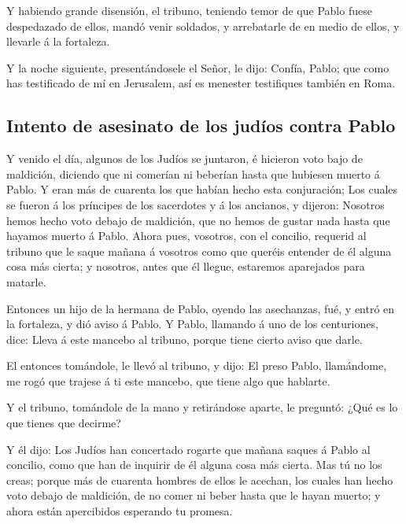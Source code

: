  Y habiendo grande disensión, el tribuno, teniendo temor
de que Pablo fuese despedazado de ellos, mandó venir soldados, y
arrebatarle de en medio de ellos, y llevarle á la fortaleza.

 Y la noche siguiente, presentándosele el Señor, le dijo:
Confía, Pablo; que como has testificado de mí en Jerusalem, así es
menester testifiques también en Roma.

\hypertarget{intento-de-asesinato-de-los-juduxedos-contra-pablo}{%
\subsection{Intento de asesinato de los judíos contra
Pablo}\label{intento-de-asesinato-de-los-juduxedos-contra-pablo}}

 Y venido el día, algunos de los Judíos se juntaron, é
hicieron voto bajo de maldición, diciendo que ni comerían ni beberían
hasta que hubiesen muerto á Pablo.  Y eran más de
cuarenta los que habían hecho esta conjuración;  Los
cuales se fueron á los príncipes de los sacerdotes y á los ancianos, y
dijeron: Nosotros hemos hecho voto debajo de maldición, que no hemos de
gustar nada hasta que hayamos muerto á Pablo.  Ahora
pues, vosotros, con el concilio, requerid al tribuno que le saque mañana
á vosotros como que queréis entender de él alguna cosa más cierta; y
nosotros, antes que él llegue, estaremos aparejados para matarle.

 Entonces un hijo de la hermana de Pablo, oyendo las
asechanzas, fué, y entró en la fortaleza, y dió aviso á Pablo.
 Y Pablo, llamando á uno de los centuriones, dice: Lleva
á este mancebo al tribuno, porque tiene cierto aviso que darle.

 El entonces tomándole, le llevó al tribuno, y dijo: El
preso Pablo, llamándome, me rogó que trajese á ti este mancebo, que
tiene algo que hablarte.

 Y el tribuno, tomándole de la mano y retirándose aparte,
le preguntó: ¿Qué es lo que tienes que decirme?

 Y él dijo: Los Judíos han concertado rogarte que mañana
saques á Pablo al concilio, como que han de inquirir de él alguna cosa
más cierta.  Mas tú no los creas; porque más de cuarenta
hombres de ellos le acechan, los cuales han hecho voto debajo de
maldición, de no comer ni beber hasta que le hayan muerto; y ahora están
apercibidos esperando tu promesa.

